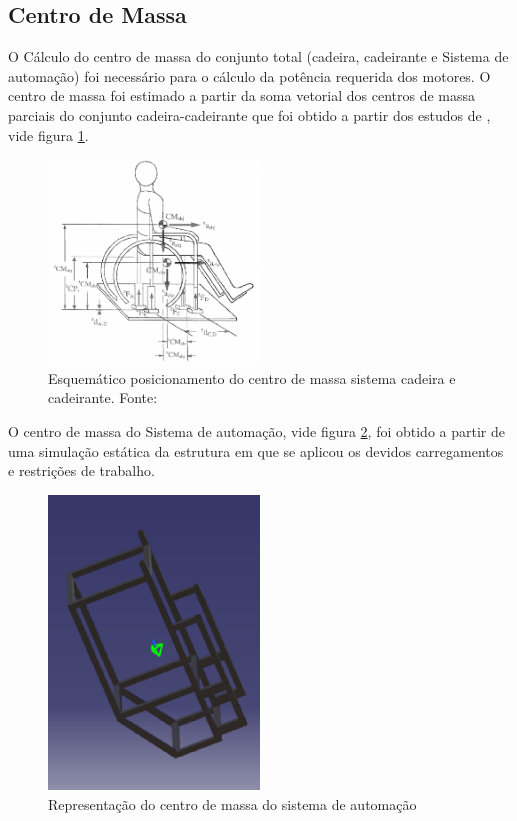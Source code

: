 \subsection{Centro de Massa}

O Cálculo do centro de massa do conjunto total (cadeira, cadeirante e Sistema de automação) foi necessário para o cálculo da potência requerida dos motores. O centro de massa foi estimado a partir da soma vetorial dos centros de massa parciais do conjunto cadeira-cadeirante que foi obtido a partir dos estudos de \cite{artigo_centro_massa}, vide figura \ref{fig:centro_massa_cadeirante}.

\begin{figure}[!htb]
\centering
\includegraphics[width = 0.5\textwidth]{figuras/resultados/centro_massa_cadeirante}
\caption{Esquemático posicionamento do centro de massa sistema cadeira e cadeirante. Fonte:\cite{artigo_centro_massa}}
\label{fig:centro_massa_cadeirante}
\end{figure}

O centro de massa do Sistema de automação, vide figura \ref{fig:centro_massa_sistema_automocao}, foi obtido a partir de uma simulação estática da estrutura em que se aplicou os devidos carregamentos e restrições de trabalho.

\begin{figure}[!htb]
\centering
\includegraphics[width = 0.5\textwidth]{figuras/resultados/centro_massa_sistema_automocao}
\caption{Representação do centro de massa do sistema de automação}
\label{fig:centro_massa_sistema_automocao}
\end{figure}

